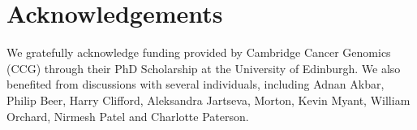 \documentclass[12pt]{article}
\begin{document}
\section{Acknowledgements}
We gratefully acknowledge funding provided by Cambridge Cancer Genomics (CCG) through their PhD Scholarship at the University of Edinburgh. We also benefited from discussions with several individuals, including Adnan Akbar, Philip Beer, Harry Clifford, Aleksandra Jartseva, Morton, Kevin Myant, William Orchard, Nirmesh Patel and Charlotte Paterson.




\end{document}
